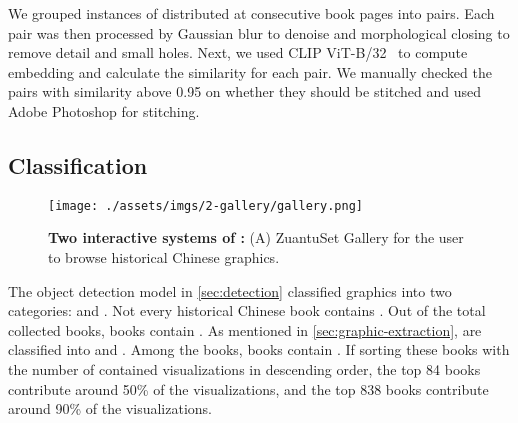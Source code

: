 We grouped instances of \schemaGraphic distributed at consecutive book pages into pairs.
Each pair was then processed by Gaussian blur to denoise and morphological closing to remove detail and small holes.
Next, we used CLIP ViT-B/32~\cite{Radford2021Learning} to compute embedding and calculate the similarity for each pair.
We manually checked the pairs with similarity above 0.95 on whether they should be stitched and used Adobe Photoshop for stitching.




\subsection{Classification}
\label{sec:classification}

\begin{figure*}[!htbp]
    \centering
    \texttt{[image: ./assets/imgs/2-gallery/gallery.png]}
    \caption{
        \textbf{Two interactive systems of \datasetName:}
        (A) ZuantuSet Gallery for the user to browse historical Chinese graphics.
    }
    \label{fig:gallery}
\end{figure*}

The object detection model in \cref{sec:detection} classified graphics into two categories:  and .
Not every historical Chinese book contains \itemType.
Out of the total \numBook collected books, \numBookHasGraphic books contain \itemType.
As mentioned in \cref{sec:graphic-extraction}, \itemType are classified into  and .
Among the books, \numBookHasVis books contain .
If sorting these books with the number of contained visualizations in descending order, the top 84 books contribute around 50\% of the visualizations, and the top 838 books contribute around 90\% of the visualizations.

